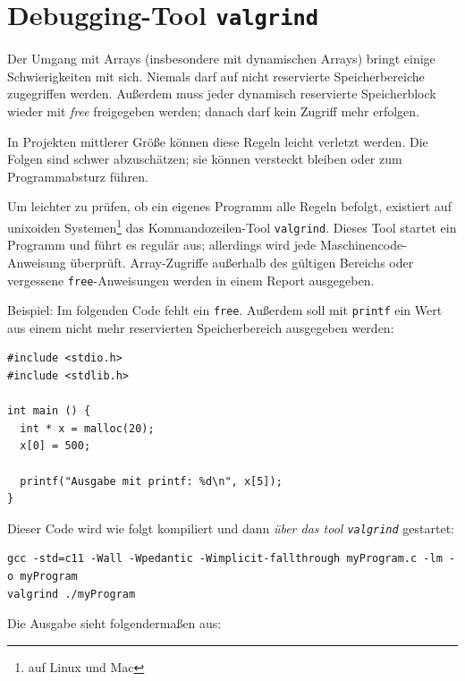 \section{Debugging-Tool \texttt{valgrind}}
Der Umgang mit Arrays (insbesondere mit dynamischen Arrays) bringt einige Schwierigkeiten mit sich. Niemals darf auf nicht reservierte Speicherbereiche zugegriffen werden. Außerdem muss jeder dynamisch reservierte Speicherblock wieder mit \emph{free} freigegeben werden; danach darf kein Zugriff mehr erfolgen.

In Projekten mittlerer Größe können diese Regeln leicht verletzt werden. Die Folgen sind schwer abzuschätzen; sie können versteckt bleiben oder zum Programmabsturz führen.

Um leichter zu prüfen, ob ein eigenes Programm alle Regeln befolgt, existiert auf unixoiden Systemen\footnote{\ie auf Linux und Mac} das Kommandozeilen-Tool \texttt{valgrind}. Dieses Tool startet ein Programm und führt es regulär aus; allerdings wird jede Maschinencode-Anweisung überprüft. Array-Zugriffe außerhalb des gültigen Bereichs oder vergessene \texttt{free}-Anweisungen werden in einem Report ausgegeben.

Beispiel: Im folgenden Code fehlt ein \texttt{free}. Außerdem soll mit \texttt{printf} ein Wert aus einem nicht mehr reservierten Speicherbereich ausgegeben werden:

\begin{warnbox}[Beispiel: Fehlerhafter Code mit dynamischer Speicherverwaltung, leftupper=7mm]
\begin{verbatim}
#include <stdio.h>
#include <stdlib.h>

int main () {
  int * x = malloc(20);
  x[0] = 500;
  
  printf("Ausgabe mit printf: %d\n", x[5]);
}
\end{verbatim}
\end{warnbox}

Dieser Code wird wie folgt kompiliert und dann \emph{über das tool \texttt{valgrind}} gestartet:

\begin{cmdbox}
\begin{verbatim}
gcc -std=c11 -Wall -Wpedantic -Wimplicit-fallthrough myProgram.c -lm -o myProgram
valgrind ./myProgram
\end{verbatim}
\end{cmdbox}

Die Ausgabe sieht folgendermaßen aus:

